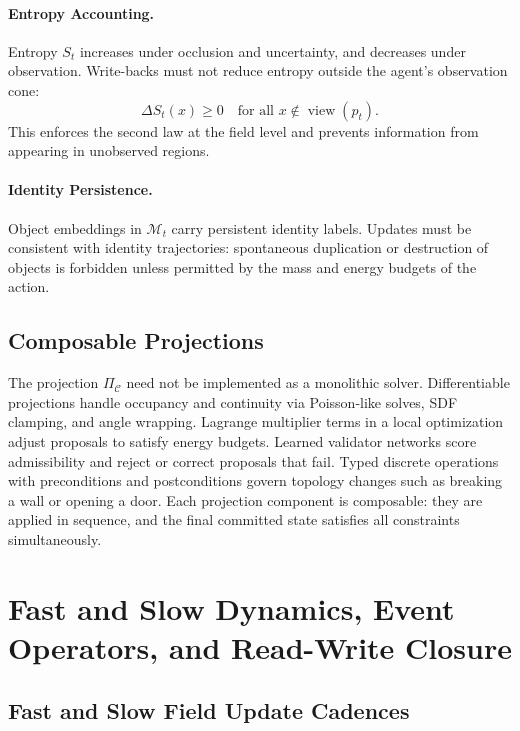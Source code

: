 \documentclass[11pt]{article}
\begin{document}
\paragraph{Entropy Accounting.}
Entropy $S_t$ increases under occlusion and uncertainty, and decreases
under observation.
Write-backs must not reduce entropy outside the agent's observation cone:
\[
\Delta S_t(x) \ge 0 \quad \text{for all } x \notin \operatorname{view}(p_t).
\]
This enforces the second law at the field level and prevents information
from appearing in unobserved regions.

\paragraph{Identity Persistence.}
Object embeddings in $\mathcal{M}_t$ carry persistent identity labels.
Updates must be consistent with identity trajectories: spontaneous
duplication or destruction of objects is forbidden unless permitted by
the mass and energy budgets of the action.

\subsection{Composable Projections}

The projection $\Pi_{\mathcal{C}}$ need not be implemented as a monolithic
solver.
Differentiable projections handle occupancy and continuity via Poisson-like
solves, SDF clamping, and angle wrapping.
Lagrange multiplier terms in a local optimization adjust proposals to
satisfy energy budgets.
Learned validator networks score admissibility and reject or correct
proposals that fail.
Typed discrete operations with preconditions and postconditions govern
topology changes such as breaking a wall or opening a door.
Each projection component is composable: they are applied in sequence, and
the final committed state satisfies all constraints simultaneously.

\section{Fast and Slow Dynamics, Event Operators, and Read-Write Closure}
\label{sec:fastslow}

\subsection{Fast and Slow Field Update Cadences}
\end{document}

